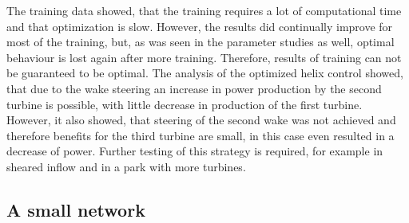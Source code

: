 The training data showed, that the training requires a lot of computational time and that optimization is slow. However, the results did continually improve for most of the training, but, as was seen in the parameter studies as well, optimal behaviour is lost again after more training. Therefore, results of training can not be guaranteed to be optimal. The analysis of the optimized helix control showed, that due to the wake steering an increase in power production by the second turbine is possible, with little decrease in production of the first turbine. However, it also showed, that steering of the second wake was not achieved and therefore benefits for the third turbine are small, in this case even resulted in a decrease of power. Further testing of this strategy is required, for example in sheared inflow and in a park with more turbines. \newpage
\subsection{A small network}
